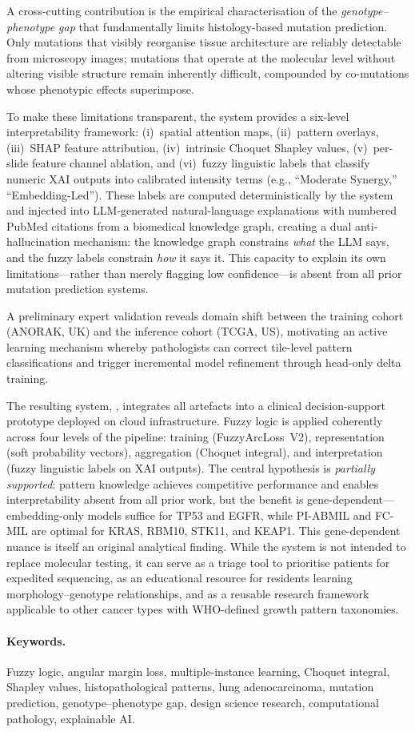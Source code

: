 A cross-cutting contribution is the empirical characterisation of
the \emph{genotype--phenotype gap} that fundamentally limits
histology-based mutation prediction.
Only mutations that visibly reorganise tissue architecture are
reliably detectable from microscopy images; mutations that operate
at the molecular level without altering visible structure remain
inherently difficult, compounded by co-mutations whose phenotypic
effects superimpose.

To make these limitations transparent, the system provides a
six-level interpretability framework: (i)~spatial attention maps,
(ii)~pattern overlays, (iii)~SHAP feature attribution,
(iv)~intrinsic Choquet Shapley values, (v)~per-slide feature
channel ablation, and (vi)~fuzzy linguistic labels that classify
numeric XAI outputs into calibrated intensity terms (e.g.,
``Moderate Synergy,'' ``Embedding-Led'').
These labels are computed deterministically by the system and
injected into LLM-generated natural-language explanations with
numbered PubMed citations from a biomedical knowledge graph,
creating a dual anti-hallucination mechanism: the knowledge graph
constrains \emph{what} the LLM says, and the fuzzy labels constrain
\emph{how} it says it.
This capacity to explain its own limitations---rather than merely
flagging low confidence---is absent from all prior mutation
prediction systems.

A preliminary expert validation reveals domain shift between the
training cohort (ANORAK, UK) and the inference cohort (TCGA, US),
motivating an active learning mechanism whereby pathologists can
correct tile-level pattern classifications and trigger incremental
model refinement through head-only delta training.

The resulting system, \lchai{}, integrates all artefacts into a
clinical decision-support prototype deployed on cloud infrastructure.
Fuzzy logic is applied coherently across four levels of the pipeline:
training (FuzzyArcLoss~V2), representation (soft probability
vectors), aggregation (Choquet integral), and interpretation
(fuzzy linguistic labels on XAI outputs).
The central hypothesis is \emph{partially supported}: pattern
knowledge achieves competitive performance and enables
interpretability absent from all prior work, but the benefit is
gene-dependent---embedding-only models suffice for TP53 and EGFR,
while PI-ABMIL and FC-MIL are optimal for KRAS,
RBM10, STK11, and KEAP1.
This gene-dependent nuance is itself an original analytical finding.
While the system is not intended to replace molecular testing,
it can serve as a triage tool to prioritise patients for expedited
sequencing, as an educational resource for residents learning
morphology--genotype relationships, and as a reusable research
framework applicable to other cancer types with WHO-defined growth
pattern taxonomies.

\paragraph{Keywords.}
Fuzzy logic, angular margin loss, multiple-instance learning,
Choquet integral, Shapley values, histopathological patterns,
lung adenocarcinoma, mutation prediction, genotype--phenotype gap,
design science research, computational pathology, explainable AI.
